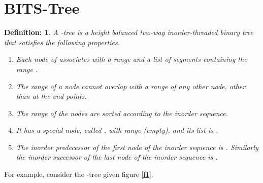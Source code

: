 \documentclass{article}
\newtheorem{definition}{Definition:}
\begin{document}
\section{BITS-Tree}
\begin{definition}
A -tree is a height balanced two-way inorder-threaded binary tree  that satisfies the following properties.
\begin{enumerate}
\itemsep=0pt
\parskip=0pt
	\item Each node  of  associates with a range  and a list of segments containing the range .
	\item The range of a node cannot overlap with a range of any other node, other than at the end points. 
	\item The range of the nodes are sorted according to the inorder sequence. 
	\item It has a special node, called , with range  (empty), and its list is . 
	\item The inorder predecessor of the first node of the inorder sequence is . Similarly the inorder successor of the last node of the inorder sequence is .
\end{enumerate}
\end{definition}
\par
For example, consider the -tree given figure \ref{f1}.
\end{document}
